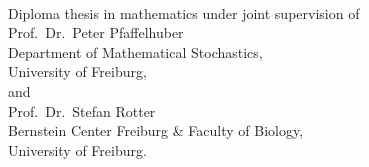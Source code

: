 \begin{titlepage}
	\begin{addmargin}[-1cm]{-3cm}
    \begin{center}
        \large  

        \hfill

        \vfill

        \begingroup
           \spacedallcaps{\myTitle} \\ \bigskip
        \endgroup

        \medskip
        \spacedlowsmallcaps{\myName}

        \vfill


        Diploma thesis in mathematics under joint
        supervision of \\
        \bigskip
        \medskip
        Prof.\ Dr.\ Peter Pfaffelhuber \\ 
        Department of Mathematical Stochastics, \\
        University of Freiburg,\\
        \medskip
        and \\ 
        \medskip
        Prof.\ Dr.\ Stefan Rotter \\
        Bernstein Center Freiburg \& Faculty of Biology, \\
        University of Freiburg. \\

        \bigskip 
        \bigskip
        \vspace{1cm}
        \myUni \\ \bigskip

        \myTime\ 

        \vfill                      

    \end{center}  
  \end{addmargin}       
\end{titlepage}   

